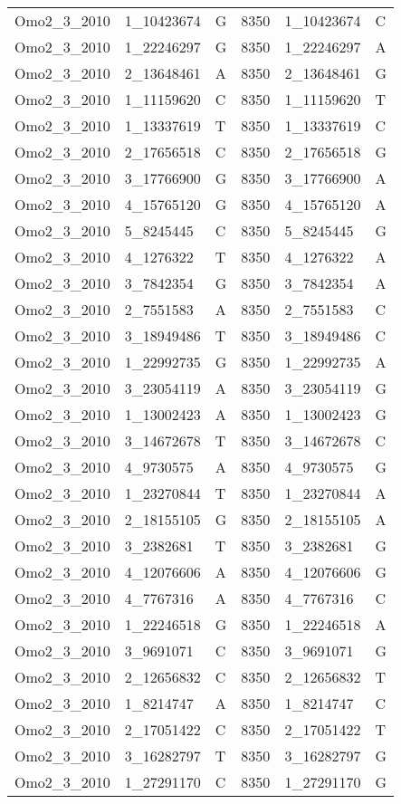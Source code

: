 \begin{center}
\begin{longtable}{|l|l|l|l|l|l|}
Omo2\_3\_2010&1\_10423674&G&8350&1\_10423674&C\\
Omo2\_3\_2010&1\_22246297&G&8350&1\_22246297&A\\
Omo2\_3\_2010&2\_13648461&A&8350&2\_13648461&G\\
Omo2\_3\_2010&1\_11159620&C&8350&1\_11159620&T\\
Omo2\_3\_2010&1\_13337619&T&8350&1\_13337619&C\\
Omo2\_3\_2010&2\_17656518&C&8350&2\_17656518&G\\
Omo2\_3\_2010&3\_17766900&G&8350&3\_17766900&A\\
Omo2\_3\_2010&4\_15765120&G&8350&4\_15765120&A\\
Omo2\_3\_2010&5\_8245445&C&8350&5\_8245445&G\\
Omo2\_3\_2010&4\_1276322&T&8350&4\_1276322&A\\
Omo2\_3\_2010&3\_7842354&G&8350&3\_7842354&A\\
Omo2\_3\_2010&2\_7551583&A&8350&2\_7551583&C\\
Omo2\_3\_2010&3\_18949486&T&8350&3\_18949486&C\\
Omo2\_3\_2010&1\_22992735&G&8350&1\_22992735&A\\
Omo2\_3\_2010&3\_23054119&A&8350&3\_23054119&G\\
Omo2\_3\_2010&1\_13002423&A&8350&1\_13002423&G\\
Omo2\_3\_2010&3\_14672678&T&8350&3\_14672678&C\\
Omo2\_3\_2010&4\_9730575&A&8350&4\_9730575&G\\
Omo2\_3\_2010&1\_23270844&T&8350&1\_23270844&A\\
Omo2\_3\_2010&2\_18155105&G&8350&2\_18155105&A\\
Omo2\_3\_2010&3\_2382681&T&8350&3\_2382681&G\\
Omo2\_3\_2010&4\_12076606&A&8350&4\_12076606&G\\
Omo2\_3\_2010&4\_7767316&A&8350&4\_7767316&C\\
Omo2\_3\_2010&1\_22246518&G&8350&1\_22246518&A\\
Omo2\_3\_2010&3\_9691071&C&8350&3\_9691071&G\\
Omo2\_3\_2010&2\_12656832&C&8350&2\_12656832&T\\
Omo2\_3\_2010&1\_8214747&A&8350&1\_8214747&C\\
Omo2\_3\_2010&2\_17051422&C&8350&2\_17051422&T\\
Omo2\_3\_2010&3\_16282797&T&8350&3\_16282797&G\\
Omo2\_3\_2010&1\_27291170&C&8350&1\_27291170&G\\

\end{longtable}
\end{center}
